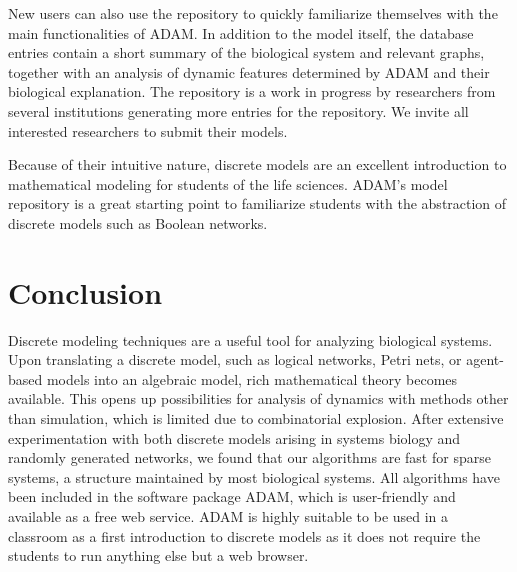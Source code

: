 \documentclass[11pt]{amsart}
\begin{document}
New users can also use the repository to quickly familiarize themselves with the main functionalities of ADAM. In addition to the model itself, the database entries contain a short summary of the biological system and relevant graphs, together with an analysis of dynamic features determined by ADAM and their biological explanation. The repository is a work in progress by researchers from several institutions generating more entries for the repository.  We invite all interested researchers to submit their models.


Because of their intuitive nature, discrete models are an excellent introduction to mathematical modeling for students of the life sciences. ADAM's model repository is a great starting point to familiarize students with the abstraction of discrete models such as Boolean networks.
\section{Conclusion}
Discrete modeling techniques are a useful tool for analyzing biological
systems. Upon translating a discrete model, such as logical networks,
Petri nets, or agent-based models into an algebraic model, rich mathematical
theory becomes available. This opens up possibilities for analysis of dynamics with methods other than
simulation, which is limited due to combinatorial explosion. After extensive experimentation with both discrete models arising in systems biology and randomly generated networks, we found that our algorithms
are fast for sparse systems, a structure maintained by most biological
systems. All algorithms have been included in the software package ADAM\cite{ADAM},
which is user-friendly and available as a free web service.
ADAM is highly suitable to be used in a classroom as a first
introduction to discrete models as it does not require the students to run
anything else but a web browser.
\end{document}
